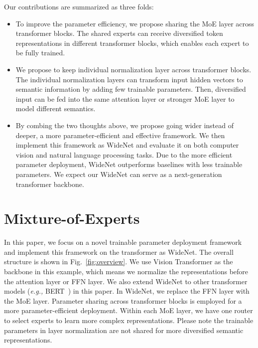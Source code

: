 \documentclass[letterpaper]{article} \usepackage{aaai22}  \usepackage{times}  \usepackage{helvet}  \usepackage{courier}  \usepackage[hyphens]{url}  \usepackage{graphicx} \urlstyle{rm} \def\UrlFont{\rm}  \usepackage{natbib}  \usepackage{caption} \DeclareCaptionStyle{ruled}{labelfont=normalfont,labelsep=colon,strut=off} \frenchspacing  \setlength{\pdfpagewidth}{8.5in}  \setlength{\pdfpageheight}{11in}  \usepackage{algorithm}
\newcommand{\eg}{\emph{e.g.,}\xspace}
\begin{document}
Our contributions are summarized as three folds:

\begin{itemize}

\item To improve the parameter efficiency, we propose sharing the MoE layer across transformer blocks. The shared experts can receive diversified token representations in different transformer blocks, which enables each expert to be fully trained.




\item We propose to keep individual normalization layer across transformer blocks. The individual normalization layers can transform input hidden vectors to semantic information by adding few trainable parameters. Then, diversified input can be fed into the same attention layer or stronger MoE layer to model different semantics.  




\item By combing the two thoughts above, we propose going wider instead of deeper, a more parameter-efficient and effective framework. We then implement this framework as WideNet and evaluate it on both computer vision and natural language processing tasks. Due to the more efficient parameter deployment, WideNet outperforms baselines with less trainable parameters. We expect our WideNet can serve as a next-generation transformer backbone.





\end{itemize}




\section{Mixture-of-Experts}
\label{sec:moe}





In this paper, we focus on a novel trainable parameter deployment framework and implement this framework on the transformer as WideNet. The overall structure is shown in Fig.~\ref{fig:overview}. We use Vision Transformer as the backbone in this example, which means we normalize the representations before the attention layer or FFN layer. We also extend WideNet to other transformer models (\eg BERT~\cite{devlin-etal-2019-bert}) in this paper. In WideNet, we replace the FFN layer with the MoE layer. Parameter sharing across transformer blocks is employed for a more parameter-efficient deployment. Within each MoE layer, we have one router to select  experts to learn more complex representations. Please note the trainable parameters in layer normalization are not shared for more diversified semantic representations.
\end{document}
